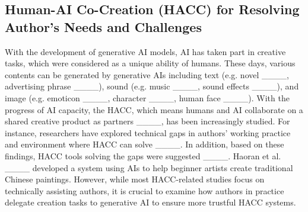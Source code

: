 \subsection{Human-AI Co-Creation (HACC) for Resolving Author’s Needs and Challenges}
With the development of generative AI models, AI has taken part in creative tasks, which were considered as a unique ability of humans. These days, various contents can be generated by generative AIs including text (e.g. novel ____, advertising phrase ____), sound (e.g. music ____, sound effects ____), and image (e.g. emoticon ____, character ____, human face ____). With the progress of AI capacity, the HACC, which means humans and AI collaborate on a shared creative product as partners ____, has been increasingly studied.
For instance, researchers have explored technical gaps in authors' working practice and environment where HACC can solve ____. %
In addition, based on these findings, HACC tools solving the gaps were suggested ____. Haoran et al. ____ developed a system using AIs to help beginner artists create traditional Chinese paintings.
However, while most HACC-related studies focus on technically assisting authors, it is crucial to examine how authors in practice delegate creation tasks to generative AI to ensure more trustful HACC systems.